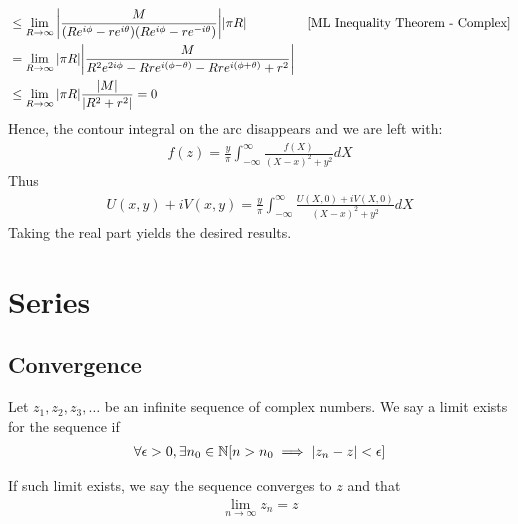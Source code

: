 \documentclass[12pt, english]{book}
\makeatletter
\renewenvironment{proof}[1][\proofname]{\par
	\pushQED{\qed}%
	\normalfont \topsep6\p@\@plus6\p@\relax
	\list{}{%
		\settowidth{\leftmargin}{\itshape\proofname:\hskip\labelsep}%
		\setlength{\labelwidth}{0pt}%
		\setlength{\itemindent}{-\leftmargin}%
	}%
	\item[\hskip\labelsep\itshape#1\@addpunct{:}]\ignorespaces
}{%
	\popQED\endlist\@endpefalse
}
\makeatother
\begin{document}
\begin{proof}
{\begin{align*}
			&\leq\lim_{R \rightarrow \infty} 
			 \abs{\frac{M}{(Re^{i\phi} - re^{i\theta})(Re^{i\phi} - re^{-i\theta})}} \abs{\pi R} & \Cref{ML Inequality Theorem - Complex} \\
			&= \lim_{R \rightarrow \infty} \abs{\pi R} 
			   \abs{\frac{M}{R^2 e^{2i\phi} - Rre^{i(\phi - \theta)} - Rre^{i(\phi + \theta)} + r^2}} \\
			&\leq \lim_{R \rightarrow \infty} \abs{\pi R} \frac{\abs{M}}{\abs{R^2 + r^2}}
			= 0 
		\end{align*}
		}
		Hence, the contour integral on the arc disappears and we are left with:
		\begin{align*}
			f(z)  = \frac{y}{\pi} \int_{-\infty}^{\infty} \frac{f(X)}{(X-x)^2 + y^2} dX
		\end{align*}
		Thus
		\begin{align*}
			U(x,y) + iV(x,y) = \frac{y}{\pi} \int_{-\infty}^{\infty} \frac{U(X, 0) + iV(X,0)}{(X-x)^2 + y^2} dX
		\end{align*}
		Taking the real part yields the desired results.
	\end{proof}

	\chapter{Series} \label{Series Chapter - Complex}
	
	\section{Convergence} \label{Convergence Section - Complex}
	
	\begin{definition}
		Let \(z_1, z_2, z_3, \ldots \) be an infinite sequence of complex numbers. We say a limit exists for the sequence if
		\begin{align*}
			\forall \epsilon > 0, \exists n_0 \in \mathbb{N}
			[n > n_0 \implies \abs{z_n - z} < \epsilon]
		\end{align*}
	\end{definition}
	
	\begin{definition}
		If such limit exists, we say the sequence converges to \(z\) and that 
		\begin{align*}
			\lim_{n \rightarrow \infty} z_n = z
		\end{align*}
	\end{definition}
	
\end{document}
